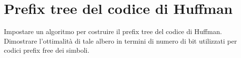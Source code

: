 \chapter{Prefix tree del codice di Huffman}

\begin{problem*}
  Impostare un algoritmo per costruire il prefix tree del codice di
  Huffman. Dimostrare l'ottimalit\`a di tale albero in termini di numero
  di bit utilizzati per codici prefix free dei simboli.
\end{problem*}

